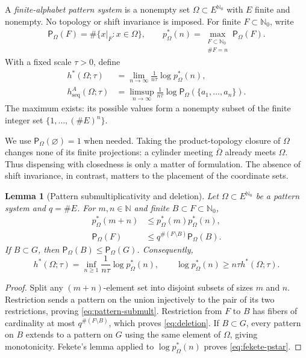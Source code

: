 \documentclass[11pt,reqno]{amsart}
\numberwithin{equation}{section}
\newtheorem{lemma}[theorem]{Lemma}
\theoremstyle{definition}
\newcommand{\N}{\mathbb N}
\newcommand{\Nzero}{\mathbb N_0}
\newcommand{\Patt}{\mathsf P}
\newcommand{\hseq}{h_{\mathrm{seq}}}
\newcommand{\hpat}{h^{*}}
\begin{document}
A \emph{finite-alphabet pattern system} is a nonempty set
$\Omega\subset E^{\Nzero}$ with $E$ finite and nonempty.  No topology or
shift invariance is imposed.  For finite $F\subset\Nzero$, write
\begin{align*}
 \Patt_\Omega(F)=\#\{x|_F:x\in\Omega\},
 \qquad
 p_\Omega^*(n)=
 \max_{\substack{F\subset\Nzero\\\#F=n}}\Patt_\Omega(F).
\end{align*}
With a fixed scale $\tau>0$, define
\begin{align*}
 \hpat(\Omega;\tau)&=\lim_{n\to\infty}
       \frac1{n\tau}\log p_\Omega^*(n),\\
 \hseq^A(\Omega;\tau)&=\limsup_{n\to\infty}
       \frac1{n\tau}\log
       \Patt_\Omega(\{a_1,\ldots,a_n\}).
\end{align*}
The maximum exists: its possible values form a nonempty subset of the finite
integer set $\{1,\ldots,(\#E)^n\}$.

We use $\Patt_\Omega(\varnothing)=1$ when needed.
Taking the product-topology closure of $\Omega$ changes none of its
finite projections: a cylinder meeting $\overline\Omega$ already meets
$\Omega$. Thus dispensing with closedness is only a matter of
formulation. The absence of shift invariance, in contrast, matters to the
placement of the coordinate sets.

\begin{lemma}[Pattern submultiplicativity and deletion]\label{lem:pattern-submult}
Let $\Omega\subset E^{\Nzero}$ be a pattern system and $q=\#E$.
For $m,n\in\N$ and finite $B\subset F\subset\Nzero$,
\begin{align}
 p_\Omega^*(m+n)&\le p_\Omega^*(m)p_\Omega^*(n),
 \label{eq:pattern-submult}\\
 \Patt_\Omega(F)&\le q^{\#(F\setminus B)}\Patt_\Omega(B).
 \label{eq:deletion} 
\end{align}
If $B\subset G$, then $\Patt_\Omega(B)\le\Patt_\Omega(G)$.
Consequently,
\begin{equation}\label{eq:fekete-pstar}
 \hpat(\Omega;\tau)
 =\inf_{n\ge1}\frac1{n\tau}\log p_\Omega^*(n),
 \qquad
 \log p_\Omega^*(n)\ge n\tau\hpat(\Omega;\tau).
\end{equation}
\end{lemma}

\begin{proof}
Split any $(m+n)$-element set into disjoint subsets of sizes $m$ and $n$.
Restriction sends a pattern on the union injectively to the pair of its two
restrictions, proving \eqref{eq:pattern-submult}.  Restriction from $F$ to
$B$ has fibers of cardinality at most $q^{\#(F\setminus B)}$, which proves
\eqref{eq:deletion}.  If $B\subset G$, every pattern on $B$ extends to a
pattern on $G$ using the same element of $\Omega$, giving monotonicity.
Fekete's lemma applied to $\log p_\Omega^*(n)$ proves
\eqref{eq:fekete-pstar}.
\end{proof}
\end{document}
